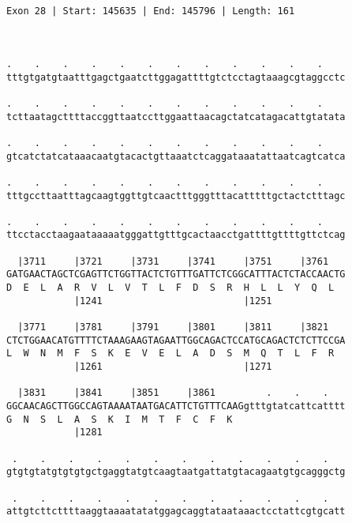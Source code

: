 \documentclass{article}
\begin{document}
\begin{Verbatim}
                                
 
Exon 28 | Start: 145635 | End: 145796 | Length: 161



.    .    .    .    .    .    .    .    .    .    .    .    
tttgtgatgtaatttgagctgaatcttggagattttgtctcctagtaaagcgtaggcctc
                                                            
.    .    .    .    .    .    .    .    .    .    .    .    
tcttaatagcttttaccggttaatccttggaattaacagctatcatagacattgtatata
                                                            
.    .    .    .    .    .    .    .    .    .    .    .    
gtcatctatcataaacaatgtacactgttaaatctcaggataaatattaatcagtcatca
                                                            
.    .    .    .    .    .    .    .    .    .    .    .    
tttgccttaatttagcaagtggttgtcaactttgggtttacatttttgctactctttagc
                                                            
.    .    .    .    .    .    .    .    .    .    .    .    
ttcctacctaagaataaaaatgggattgtttgcactaacctgattttgttttgttctcag
                                                            
  |3711     |3721     |3731     |3741     |3751     |3761   
GATGAACTAGCTCGAGTTCTGGTTACTCTGTTTGATTCTCGGCATTTACTCTACCAACTG
D  E  L  A  R  V  L  V  T  L  F  D  S  R  H  L  L  Y  Q  L  
            |1241                         |1251             
  
  |3771     |3781     |3791     |3801     |3811     |3821   
CTCTGGAACATGTTTTCTAAAGAAGTAGAATTGGCAGACTCCATGCAGACTCTCTTCCGA
L  W  N  M  F  S  K  E  V  E  L  A  D  S  M  Q  T  L  F  R  
            |1261                         |1271             
  
  |3831     |3841     |3851     |3861         .    .    .   
GGCAACAGCTTGGCCAGTAAAATAATGACATTCTGTTTCAAGgtttgtatcattcatttt
G  N  S  L  A  S  K  I  M  T  F  C  F  K                    
            |1281                                           
  
 .    .    .    .    .    .    .    .    .    .    .    .   
gtgtgtatgtgtgtgctgaggtatgtcaagtaatgattatgtacagaatgtgcagggctg
                                                            
 .    .    .    .    .    .    .    .    .    .    .    .   
attgtcttcttttaaggtaaaatatatggagcaggtataataaactcctattcgtgcatt
                                                            

\end{Verbatim}
\end{document}
